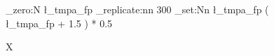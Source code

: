 \documentclass{article}
\begin{document}
\begin{figure}
\ExplSyntaxOn
\fp_zero:N \l_tmpa_fp
\prg_replicate:nn { 300 } { \fp_set:Nn \l_tmpa_fp { ( \l_tmpa_fp + 1.5 ) * 0.5 } }
\ExplSyntaxOff
\caption{X}
\end{figure}
\gdef\SatexReachedEnd{}
\end{document}
